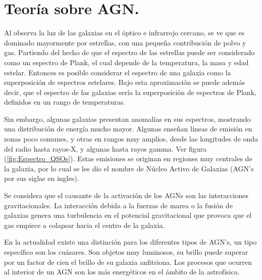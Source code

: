 \begin{savequote}[50mm]
\end{savequote}




\chapter{Teoría sobre AGN.}
\label{cha:Theoretical Framework}


Al observa la luz de las galaxias en el óptico e infrarrojo cercano, se ve que es dominado mayormente por estrellas, con una pequeña contribución de polvo y gas. Partiendo del hecho de que el espectro de las estrellas puede ser considerado como un espectro de Plank, el cual depende de la temperatura, la masa y edad estelar. Entonces es posible considerar el espectro de una galaxia como la superposición de espectros  estelares. Bajo esta aproximación se puede además decir, que el espectro de las galaxias sería la superposición de espectros de Plank, definidos en un rango de temperaturas. 

Sin embargo, algunas galaxias presentan anomalías en sus espectros,  mostrando una distribución de energía mucho mayor. Algunas enseñan líneas de emisión en zonas poco comunes, y otras en rangos muy amplios, desde las longitudes de onda del radio hasta rayos-X, y algunas hasta rayos gamma. Ver figura (\ref{fig:Espectro_QSOs}). Estas emisiones se originan en regiones muy centrales de la galaxia, por lo cual se les dio el nombre de Núcleo Activo de Galaxias (AGN's por sus siglas en ingles).

Se considera que el causante de la activación de los AGNs son las interacciones gravitacionales. La interacción debida a la fuerzas de marea o la fusión de galaxias genera una turbulencia en el potencial gravitacional que provoca que el gas empiece a colapsar hacia el centro de la galaxia. 

En la actualidad existe una distinción para los diferentes tipos de  AGN's, un tipo específico son los cuásares. Son objetos muy luminosos, su brillo puede superar por un factor de cien el brillo de su galaxia anfitriona. Los procesos que ocurren al interior de un AGN son los más energéticos en el ámbito de la astrofísica. 


